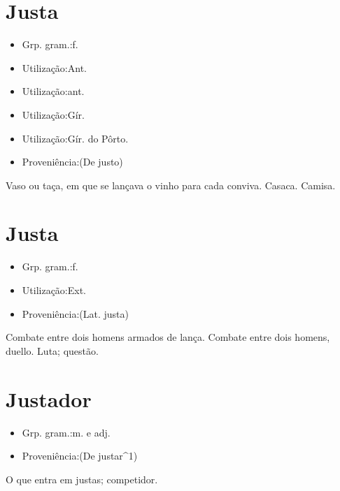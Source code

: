 \documentclass{article}
\begin{document}
\section{Justa}
\begin{itemize}
\item {Grp. gram.:f.}
\end{itemize}
\begin{itemize}
\item {Utilização:Ant.}
\end{itemize}
\begin{itemize}
\item {Utilização:ant.}
\end{itemize}
\begin{itemize}
\item {Utilização:Gír.}
\end{itemize}
\begin{itemize}
\item {Utilização:Gír. do Pôrto.}
\end{itemize}
\begin{itemize}
\item {Proveniência:(De \textunderscore justo\textunderscore )}
\end{itemize}
Vaso ou taça, em que se lançava o vinho para cada conviva.
Casaca.
Camisa.
\section{Justa}
\begin{itemize}
\item {Grp. gram.:f.}
\end{itemize}
\begin{itemize}
\item {Utilização:Ext.}
\end{itemize}
\begin{itemize}
\item {Proveniência:(Lat. \textunderscore justa\textunderscore )}
\end{itemize}
Combate entre dois homens armados de lança.
Combate entre dois homens, duello.
Luta; questão.
\section{Justador}
\begin{itemize}
\item {Grp. gram.:m.  e  adj.}
\end{itemize}
\begin{itemize}
\item {Proveniência:(De \textunderscore justar\textunderscore ^1)}
\end{itemize}
O que entra em justas; competidor.
\end{document}

